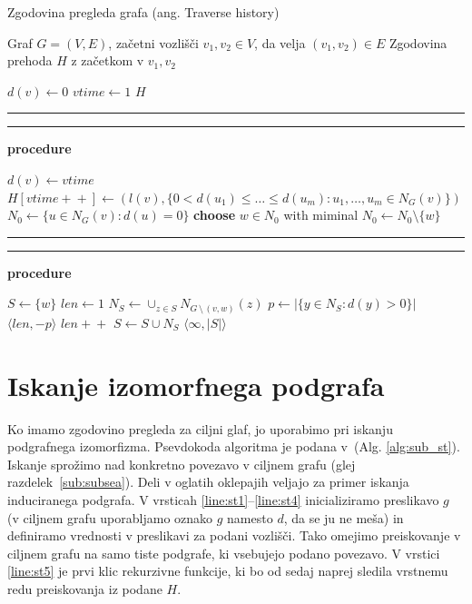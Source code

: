 \documentclass[a4paper, 12pt, ]{book}
\newcommand\Subalg[1]{%
	\Statex%
	\vspace*{-.7\baselineskip}%
	\hspace*{\dimexpr-\algorithmicindent-4pt\relax}%
	\rule{\textwidth}{0.4pt}%
	\Statex%
	
	\vspace*{-.7\baselineskip}%
	\Statex\hspace*{\dimexpr-\algorithmicindent-2pt\relax}%
	\rule{\textwidth}{0.4pt}%
	
	\Statex\hspace*{-\algorithmicindent}\textbf{procedure} #1%
}
\newcommand{\refalg}[1]{(Alg. \ref{#1})}
\begin{document}
\begin{algorithm}
\caption{Zgodovina pregleda grafa (ang. Traverse history)}
\label{alg:sub_th}
\begin{algorithmic}[1]
	\Require Graf $G = (V, E)$, začetni vozlišči $v_1, v_2 \in V$, da velja $(v_1, v_2) \in E$
	\Ensure Zgodovina prehoda $H$ z začetkom v $v_1, v_2$

				\label{line:th1}
		\State $d(v) \gets 0$
	\EndFor
	\State $vtime \gets 1$
	\State {}		\label{line:th4}
	\State \Return $H$


	\Subalg{}
	\State $d(v) \gets vtime$ 		\label{line:th6}
	\State $H[vtime+\!+] \gets (l(v), \{0 < d(u_1) \leq \ldots \leq d(u_m) : u_1, \ldots, u_m \in N_G(v)\})$ 	\label{line:th7}
								\label{line:th8}
	\EndIf
	\State $N_0 \gets \{ u \in N_G(v): d(u) = 0 \}$		\label{line:th9}
						\label{line:th10}
		\State \textbf{choose} $w \in N_0$ with miminal 		\label{line:th11}
								\label{line:th12}
		\EndIf
		\State $N_0 \gets N_0 \setminus \{w\}$		\label{line:th13}
	\EndWhile


	\Subalg{}
	\State $S \gets \{w\}$						\label{line:th14}
	\State $len \gets 1$							\label{line:th15}
	\Repeat
		\State $N_S \gets \cup_{z \in S}N_{G\, \setminus\,  (v,w)}(z)$	\label{line:th17}
		\State $p \gets | \{ y \in N_S: d(y) > 0 \} |$					\label{line:th18}
												\label{line:th19}
			\Return $\langle len, -p \rangle$
		\EndIf
		\State $len+\!+$						\label{line:th20}
		\State $S \gets S \cup N_S$			\label{line:th21}
					\label{line:th22}
	\State \Return $ \langle \infty, |S| \rangle $	\label{line:th23}
\end{algorithmic}
\end{algorithm}

	\clearpage


	\section{Iskanje izomorfnega podgrafa}
	\label{sub:search}
	Ko imamo zgodovino pregleda za ciljni glaf, jo uporabimo pri iskanju podgrafnega izomorfizma. Psevdokoda algoritma je podana v~\refalg{alg:sub_st}.
	Iskanje sprožimo nad konkretno povezavo v ciljnem grafu (glej razdelek~\ref{sub:subsea}). Deli v oglatih oklepajih veljajo za primer iskanja
	induciranega podgrafa. V vrsticah \ref{line:st1}--\ref{line:st4} inicializiramo preslikavo $g$ (v ciljnem grafu uporabljamo oznako $g$ namesto $d$,
	da se ju ne meša) in definiramo vrednosti v preslikavi za podani vozlišči. Tako omejimo preiskovanje v ciljnem grafu na samo tiste podgrafe, ki 
	vsebujejo podano povezavo. V vrstici \ref{line:st5} je prvi klic rekurzivne funkcije, ki bo od sedaj naprej sledila vrstnemu redu preiskovanja iz podane
	$H$.
	
\end{document}
